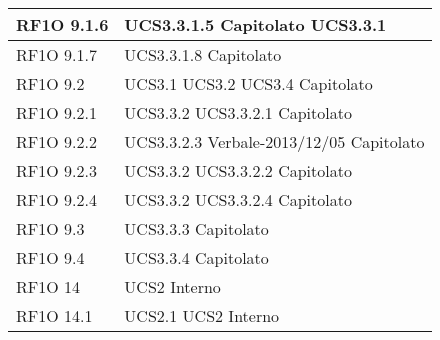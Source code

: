 \begin{center}
\begin{longtable}{ | p{5cm} | p{5cm} |}
        RF1O 9.1.6 &  UCS3.3.1.5 \newline  Capitolato \newline  UCS3.3.1 \newline  \\ \hline      
        RF1O 9.1.7 &  UCS3.3.1.8 \newline  Capitolato \newline  \\ \hline      
        RF1O 9.2 &  UCS3.1 \newline  UCS3.2 \newline  UCS3.4 \newline  Capitolato \newline  \\ \hline      
        RF1O 9.2.1  &  UCS3.3.2 \newline  UCS3.3.2.1 \newline  Capitolato \newline  \\ \hline      
        RF1O 9.2.2  &  UCS3.3.2.3 \newline  Verbale-2013/12/05 \newline  Capitolato \newline  \\ \hline      
        RF1O 9.2.3 &  UCS3.3.2 \newline  UCS3.3.2.2 \newline  Capitolato \newline  \\ \hline      
        RF1O 9.2.4 &  UCS3.3.2 \newline  UCS3.3.2.4 \newline  Capitolato \newline  \\ \hline      
        RF1O 9.3 &  UCS3.3.3 \newline  Capitolato \newline  \\ \hline      
        RF1O 9.4 &  UCS3.3.4 \newline  Capitolato \newline  \\ \hline      
        RF1O 14 &  UCS2 \newline  Interno \newline  \\ \hline      
        RF1O 14.1 &  UCS2.1 \newline  UCS2 \newline  Interno \newline  \\ \hline      

\end{longtable}
\end{center}
